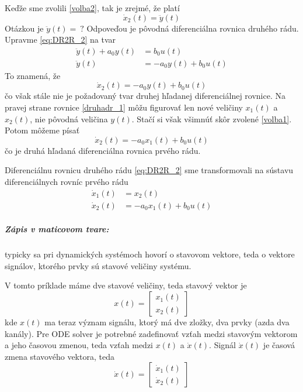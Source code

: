 \documentclass[a4paper, 10pt, ]{article}
\begin{document}
Keďže sme zvolili \eqref{volba2}, tak je zrejmé, že platí
\begin{equation} 
    \dot x_2(t) = \ddot y(t)
\end{equation}
Otázkou je $\ddot y(t) = \ ?$ Odpoveďou je pôvodná diferenciálna rovnica druhého rádu. Upravme \eqref{eq:DR2R_2} na tvar
\begin{align}
    \ddot y(t)  + a_0 y(t) &= b_0 u(t) \\
    \ddot y(t) &=  - a_0 y(t) +  b_0 u(t) 
\end{align}
To znamená, že
\begin{equation}  \label{druhadr_1}
    \dot x_2(t) =  - a_0 y(t) +  b_0 u(t) 
\end{equation}
čo však stále nie je požadovaný tvar druhej hľadanej diferenciálnej rovnice. Na pravej strane rovnice \eqref{druhadr_1} môžu figurovať len nové veličiny $x_1(t)$ a $x_2(t)$, nie pôvodná veličina $y(t)$. Stačí si však všimnúť skôr zvolené \eqref{volba1}. Potom môžeme písať
\begin{equation}  \label{druhadr_2}
    \dot x_2(t) =  - a_0 x_1(t) +  b_0 u(t) 
\end{equation}
čo je druhá hľadaná diferenciálna rovnica prvého rádu.

Diferenciálnu rovnicu druhého rádu \eqref{eq:DR2R_2} sme transformovali na sústavu diferenciálnych rovníc prvého rádu
\begin{subequations} \label{druhadr_sustava}
\begin{align}
    \dot x_1(t) &= x_2(t) \\
    \dot x_2(t) &=  - a_0 x_1(t) +  b_0 u(t) 
\end{align}
\end{subequations}

\subparagraph{Zápis v maticovom tvare:}

typicky sa pri dynamických systémoch hovorí o stavovom vektore, teda o vektore signálov, ktorého prvky sú stavové veličiny systému. 

V tomto príklade máme dve stavové veličiny, teda stavový vektor je
\begin{equation}
    x(t) = \begin{bmatrix} x_1(t) \\ x_2(t) \end{bmatrix}
\end{equation}
kde $x(t)$ ma teraz význam signálu, ktorý má dve zložky, dva prvky (azda dva kanály). Pre ODE solver je potrebné zadefinovať vzťah medzi stavovým vektorom a jeho časovou zmenou, teda vzťah medzi $x(t)$ a $\dot x(t)$. Signál $\dot x(t)$ je časová zmena stavového vektora, teda
\begin{equation}
    \dot x(t) = \begin{bmatrix} \dot x_1(t) \\ \dot x_2(t) \end{bmatrix}
\end{equation}
\end{document}

